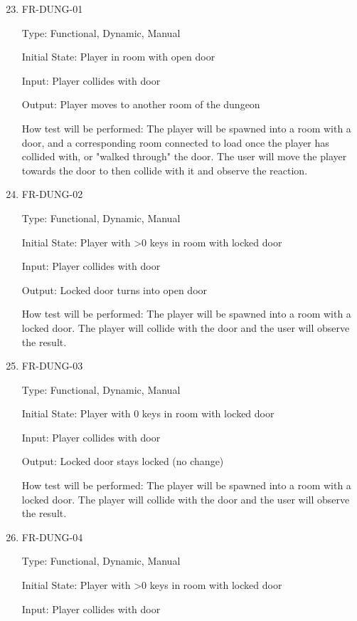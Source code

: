 \documentclass[12pt, titlepage]{article}
\begin{document}
\begin{enumerate}
	\setcounter{enumi}{22}	
	
\item{FR-DUNG-01\\}

Type: Functional, Dynamic, Manual

Initial State: Player in room with open door

Input: Player collides with door

Output: Player moves to another room of the dungeon

How test will be performed: The player will be spawned into a room with a door, and a corresponding room connected to load once the player has collided with, or "walked through" the door. The user will move the player towards the door to then collide with it and observe the reaction.

\item{FR-DUNG-02\\}

Type: Functional, Dynamic, Manual

Initial State: Player with >0 keys in room with locked door

Input: Player collides with door 

Output: Locked door turns into open door

How test will be performed: The player will be spawned into a room with a locked door. The player will collide with the door and the user will observe the result.

\item{FR-DUNG-03\\}

Type: Functional, Dynamic, Manual

Initial State: Player with 0 keys in room with locked door

Input: Player collides with door 

Output: Locked door stays locked (no change)

How test will be performed: The player will be spawned into a room with a locked door. The player will collide with the door and the user will observe the result.

\item{FR-DUNG-04\\}

Type: Functional, Dynamic, Manual

Initial State: Player with >0 keys in room with locked door

Input: Player collides with door 


\end{enumerate}
\end{document}
